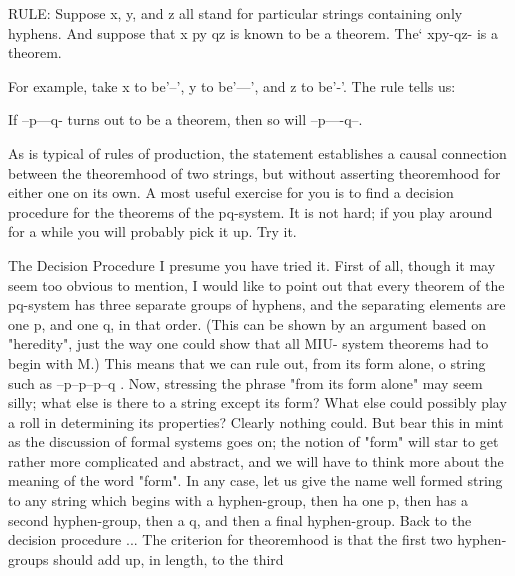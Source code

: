 RULE: Suppose x, y, and z all stand for particular strings containing only hyphens. And suppose that x py qz is known to be a theorem. The` xpy-qz- is a theorem. 

For example, take x to be'--', y to be'---', and z to be'-'. The rule tells us: 

If --p---q- turns out to be a theorem, then so will --p----q--. 



As is typical of rules of production, the statement establishes a causal connection between the theoremhood of two strings, but without asserting theoremhood for either one on its own. A most useful exercise for you is to find a decision procedure for the theorems of the pq-system. It is not hard; if you play around for a while you will probably pick it up. Try it. 



The Decision Procedure I presume you have tried it. First of all, though it may seem too obvious to mention, I would like to point out that every theorem of the pq-system has three separate groups of hyphens, and the separating elements are one p, and one q, in that order. (This can be shown by an argument based on "heredity", just the way one could show that all MIU- system theorems had to begin with M.) This means that we can rule out, from its form alone, o string such as --p--p--p--q . Now, stressing the phrase "from its form alone" may seem silly; what else is there to a string except its form? What else could possibly play a roll in determining its properties? Clearly nothing could. But bear this in mint as the discussion of formal systems goes on; the notion of "form" will star to get rather more complicated and abstract, and we will have to think more about the meaning of the word "form". In any case, let us give the name well formed string to any string which begins with a hyphen-group, then ha one p, then has a second hyphen-group, then a q, and then a final hyphen-group. Back to the decision procedure ... The criterion for theoremhood is that the first two hyphen-groups should add up, in length, to the third 







